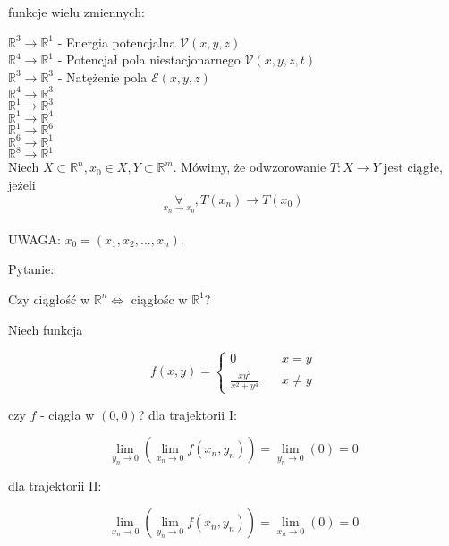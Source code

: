 \documentclass[../main.tex]{subfiles}
\begin{document}
\begin{przyklad}
    funkcje wielu zmiennych:
\end{przyklad}


\noindent
$\mathbb{R}^{3}\rightarrow\mathbb{R}^{1}$ - Energia potencjalna $\mathcal{V}(x,y,z)$\\
$\mathbb{R}^{4}\rightarrow\mathbb{R}^{1}$ - Potencjał pola niestacjonarnego $\mathcal{V}(x,y,z,t)$\\
$\mathbb{R}^{3}\rightarrow\mathbb{R}^{3}$ - Natężenie pola $\mathcal{E}(x,y,z)$\\
$\mathbb{R}^{4}\rightarrow\mathbb{R}^{3}$\\
$\mathbb{R}^{1}\rightarrow\mathbb{R}^{3}$\\
$\mathbb{R}^{1}\rightarrow\mathbb{R}^{4}$\\
$\mathbb{R}^{1}\rightarrow\mathbb{R}^{6}$\\
$\mathbb{R}^{6}\rightarrow\mathbb{R}^{1}$\\
$\mathbb{R}^{8}\rightarrow\mathbb{R}^{1}$\\

Niech $X\subset\mathbb{R}^n, x_{0} \in X, Y\subset\mathbb{R}^m$. Mówimy, że odwzorowanie $T: X\rightarrow Y$ jest ciągłe, jeżeli $$\underset{x_n \to x_0}{\forall}, T(x_{n})\rightarrow T(x_{0})$$\\
UWAGA: $x_{0} = (x_{1}, x_{2}, ..., x_{n})$.

\vspace{1cm}
\begin{large}
    Pytanie:
\end{large}
Czy ciągłość w $\mathbb{R}^{n} \iff$ ciągłośc w $\mathbb{R}^{1}$?

\begin{przyklad}
    Niech funkcja
\end{przyklad}

\[ f(x,y) =
\begin{cases}
    0                           & \quad x=y\\
    \frac{xy^2}{x^2+y^4}  & \quad x\neq y
\end{cases}
\]

czy $f$ - ciągła w $(0,0)$?
dla trajektorii I:

$$\lim\limits_{y_{n}\to 0}(\lim\limits_{x_{n}\rightarrow 0} f(x_{n},y_{n})) = \lim\limits_{y_{n}\rightarrow 0}(0) = 0$$

dla trajektorii II:

$$\lim\limits_{x_{n}\to 0}(\lim\limits_{y_{n}\rightarrow 0} f(x_{n},y_{n})) = \lim\limits_{x_{n}\rightarrow 0}(0) = 0$$
\end{document}
